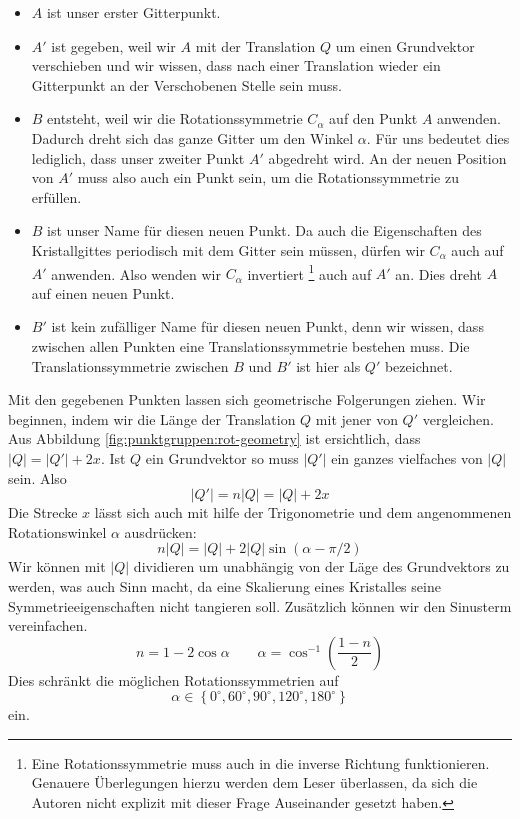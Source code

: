  \begin{itemize}
     \item  $A$ ist unser erster Gitterpunkt. 

     \item  $A'$ ist gegeben, weil wir $A$ mit der Translation $Q$ um einen Grundvektor verschieben und wir wissen, 
            dass nach einer Translation wieder ein Gitterpunkt an der Verschobenen Stelle sein muss.
     \item $B$ entsteht, weil wir die Rotationssymmetrie $C_\alpha$ auf den Punkt $A$ anwenden.
            Dadurch dreht sich das ganze Gitter um den Winkel $\alpha$. 
            Für uns bedeutet dies lediglich, dass unser zweiter Punkt $A'$ abgedreht wird.
            An der neuen Position von $A'$ muss also auch ein Punkt sein, um die Rotationssymmetrie zu erfüllen.
      \item $B$ ist unser Name für diesen neuen Punkt. 
            Da auch die Eigenschaften des Kristallgittes periodisch mit dem Gitter sein müssen, dürfen wir $C_\alpha$ auch auf $A'$ anwenden.
            Also wenden wir $C_\alpha$ invertiert
            \footnote{Eine Rotationssymmetrie muss auch in die inverse Richtung funktionieren. 
            Genauere Überlegungen hierzu werden dem Leser überlassen, da sich die Autoren nicht explizit mit dieser Frage Auseinander gesetzt haben.} 
            auch auf $A'$ an. 
            Dies dreht $A$ auf einen neuen Punkt.
     \item $B'$ ist kein zufälliger Name für diesen neuen Punkt, denn wir wissen, dass zwischen allen Punkten eine Translationssymmetrie bestehen muss.
            Die Translationssymmetrie zwischen $B$ und $B'$ ist hier als $Q'$ bezeichnet.
 \end{itemize}  
 Mit den gegebenen Punkten lassen sich geometrische Folgerungen ziehen.
 Wir beginnen, indem wir die Länge der Translation $Q$ mit jener von $Q'$ vergleichen.
 Aus Abbildung \ref{fig:punktgruppen:rot-geometry} ist ersichtlich, dass $|Q| = |Q'|+ 2x$.
 Ist $Q$ ein Grundvektor so muss $|Q'|$ ein ganzes vielfaches von $|Q|$ sein. Also 
 \[
    |Q'| = n|Q| = |Q| + 2x
 \]
 Die Strecke $x$ lässt sich auch mit hilfe der Trigonometrie und dem angenommenen Rotationswinkel $\alpha$ ausdrücken:
 \[
    n|Q| = |Q| + 2|Q|\sin(\alpha - \pi/2)
 \]
 Wir können mit $|Q|$ dividieren um unabhängig von der Läge des Grundvektors zu werden, 
 was auch Sinn macht, da eine Skalierung eines Kristalles seine Symmetrieeigenschaften nicht tangieren soll. 
 Zusätzlich können wir den Sinusterm vereinfachen.
 \[
     n = 1 - 2\cos\alpha \qquad
     \alpha = \cos^{-1}\left(\frac{1-n}{2}\right)
 \]
 Dies schränkt die möglichen Rotationssymmetrien auf 
 \[
     \alpha \in \left\{ 0^\circ, 60^\circ, 90^\circ, 120^\circ, 180^\circ\right\}
 \]
ein.

